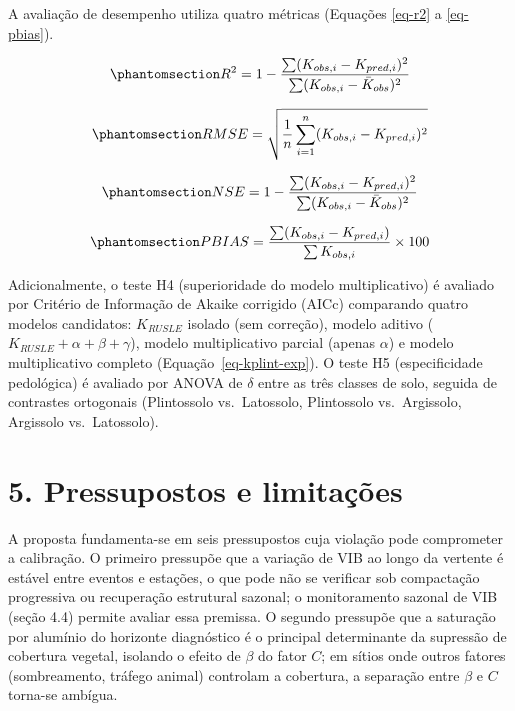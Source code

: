 \documentclass[
  brazilian,
  authoryear,
  preprint]{elsarticle}
\begin{document}
A avaliação de desempenho utiliza quatro métricas (Equações \ref{eq-r2}
a \ref{eq-pbias}).

\begin{equation}\phantomsection\label{eq-r2}{
R^2 = 1 - \dfrac{\sum(K_{obs,i} - K_{pred,i})^2}{\sum(K_{obs,i} - \bar{K}_{obs})^2}
}\end{equation}

\begin{equation}\phantomsection\label{eq-rmse}{
RMSE = \sqrt{\dfrac{1}{n}\sum_{i=1}^{n}(K_{obs,i} - K_{pred,i})^2}
}\end{equation}

\begin{equation}\phantomsection\label{eq-nse}{
NSE = 1 - \dfrac{\sum(K_{obs,i} - K_{pred,i})^2}{\sum(K_{obs,i} - \bar{K}_{obs})^2}
}\end{equation}

\begin{equation}\phantomsection\label{eq-pbias}{
PBIAS = \dfrac{\sum(K_{obs,i} - K_{pred,i})}{\sum K_{obs,i}} \times 100
}\end{equation}

Adicionalmente, o teste H4 (superioridade do modelo multiplicativo) é
avaliado por Critério de Informação de Akaike corrigido (AICc)
comparando quatro modelos candidatos: \(K_{RUSLE}\) isolado (sem
correção), modelo aditivo (\(K_{RUSLE} + \alpha + \beta + \gamma\)),
modelo multiplicativo parcial (apenas \(\alpha\)) e modelo
multiplicativo completo (Equação~\ref{eq-kplint-exp}). O teste H5
(especificidade pedológica) é avaliado por ANOVA de \(\delta\) entre as
três classes de solo, seguida de contrastes ortogonais (Plintossolo
vs.~Latossolo, Plintossolo vs.~Argissolo, Argissolo vs.~Latossolo).

\section{5. Pressupostos e
limitações}\label{pressupostos-e-limitauxe7uxf5es}

A proposta fundamenta-se em seis pressupostos cuja violação pode
comprometer a calibração. O primeiro pressupõe que a variação de VIB ao
longo da vertente é estável entre eventos e estações, o que pode não se
verificar sob compactação progressiva ou recuperação estrutural sazonal;
o monitoramento sazonal de VIB (seção 4.4) permite avaliar essa
premissa. O segundo pressupõe que a saturação por alumínio do horizonte
diagnóstico é o principal determinante da supressão de cobertura
vegetal, isolando o efeito de \(\beta\) do fator \(C\); em sítios onde
outros fatores (sombreamento, tráfego animal) controlam a cobertura, a
separação entre \(\beta\) e \(C\) torna-se ambígua.
\end{document}
